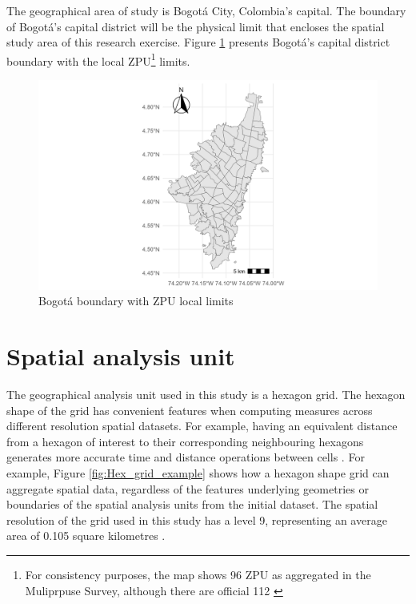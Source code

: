 \documentclass[12pt, a4paper]{report}
\begin{document}
The geographical area of study is Bogotá City, Colombia's capital. The boundary of Bogotá's capital district will be the physical limit that encloses the spatial study area of this research exercise. Figure \ref{fig:Study_Area_ZPU} presents Bogotá's capital district boundary with the local ZPU\footnote{For consistency purposes, the map shows 96 ZPU as aggregated in the Muliprpuse Survey, although there are official 112 \citep{secretariadistritaldegobiernoCaracterizacionUsuarios20212021}} limits.

\begin{figure}[H]
    \centering
    \includegraphics[width=16cm]{Data/Results/Images/Study_Area_UPZ.png}
    \caption{Bogotá boundary with ZPU local limits \citep{ secretariadistritaldeplaneacionCapaGeograficaEncuesta2023}}
    \label{fig:Study_Area_ZPU}
\end{figure}


\section{Spatial analysis unit}

The geographical analysis unit used in this study is a hexagon grid. The hexagon shape of the grid has convenient features when computing measures across different resolution spatial datasets. For example, having an equivalent distance from a hexagon of interest to their corresponding neighbouring hexagons generates more accurate time and distance operations between cells \citep{ubertechnologiesH3HexagonalHierarchical2023}. For example, Figure \ref{fig:Hex_grid_example} shows how a hexagon shape grid can aggregate spatial data, regardless of the features underlying geometries or boundaries of the spatial analysis units from the initial dataset. The spatial resolution of the grid used in this study has a level 9, representing an average area of 0.105 square kilometres \citep{ubertechnologiesH3HexagonalHierarchical2023}.
\end{document}
